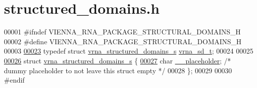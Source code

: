 \hypertarget{structured__domains_8h_source}{}\section{structured\+\_\+domains.\+h}
\label{structured__domains_8h_source}

\begin{DoxyCode}
00001 \textcolor{preprocessor}{#ifndef VIENNA\_RNA\_PACKAGE\_STRUCTURAL\_DOMAINS\_H}
00002 \textcolor{preprocessor}{#define VIENNA\_RNA\_PACKAGE\_STRUCTURAL\_DOMAINS\_H}
00003 
\mbox{\hyperlink{structured__domains_8h_afa7bbdebb6be4a0d8b829208d4083383}{00023}} \textcolor{keyword}{typedef} \textcolor{keyword}{struct }\mbox{\hyperlink{structvrna__structured__domains__s}{vrna\_structured\_domains\_s}} \mbox{\hyperlink{structvrna__structured__domains__s}{vrna\_sd\_t}};
00024 
00025 
\mbox{\hyperlink{structvrna__structured__domains__s}{00026}} \textcolor{keyword}{struct }\mbox{\hyperlink{structvrna__structured__domains__s}{vrna\_structured\_domains\_s}} \{
\mbox{\hyperlink{structvrna__structured__domains__s_acba7ee206068db17beb69ac438935aeb}{00027}}   \textcolor{keywordtype}{char} \mbox{\hyperlink{structvrna__structured__domains__s_acba7ee206068db17beb69ac438935aeb}{\_\_placeholder}}; \textcolor{comment}{/* dummy placeholder to not leave this struct empty */}
00028 \};
00029 
00030 \textcolor{preprocessor}{#endif}
\end{DoxyCode}
